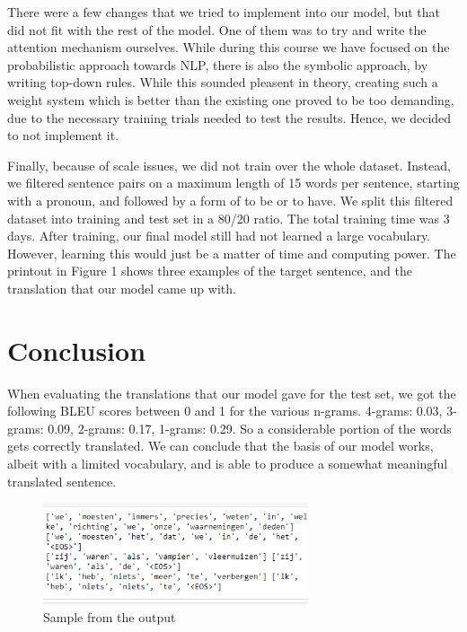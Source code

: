 \documentclass[11pt]{article}
\begin{document}
There were a few changes that we tried to implement into our model, but that did not fit with the rest of the model. One of them was to try and write the attention mechanism ourselves. While during this course we have focused on the probabilistic approach towards NLP, there is also the symbolic approach, by writing top-down rules. While this sounded pleasent in theory, creating such a weight system which is better than the existing one proved to be too demanding, due to the necessary training trials needed to test the results. Hence, we decided to not implement it.

Finally, because of scale issues, we did not train over the whole dataset. Instead, we filtered sentence pairs on a maximum length of 15 words per sentence, starting with a pronoun, and followed by a form of to be or to have. We split this filtered dataset into training and test set in a 80/20 ratio. The total training time was 3 days. After training, our final model still had not learned a large vocabulary. However, learning this would just be a matter of time and computing power. The printout in Figure 1 shows three examples of the target sentence, and the translation that our model came up with. 

\section{Conclusion}

When evaluating the translations that our model gave for the test set, we got the following BLEU scores between 0 and 1 for the various n-grams. 4-grams: 0.03, 3-grams: 0.09, 2-grams: 0.17, 1-grams: 0.29. So a considerable portion of the words gets correctly translated. We can conclude that the basis of our model works, albeit with a limited vocabulary, and is able to produce a somewhat meaningful translated sentence.

\begin{figure}[h]
    \includegraphics[width=7.8cm]{Sample_output.png}
    \caption{Sample from the output}
    \label{Figure 1}
\end{figure}
\end{document}
